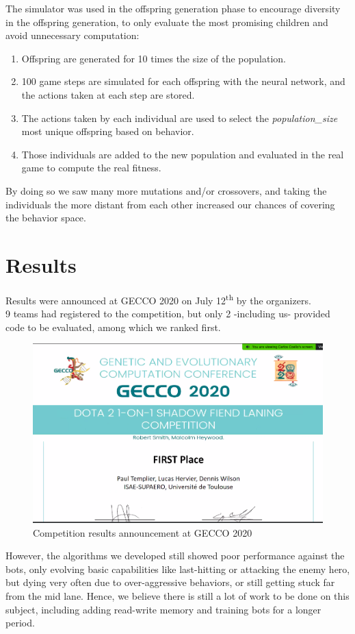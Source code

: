 The simulator was used in the offspring generation phase to encourage diversity in the offspring generation, to only evaluate the most promising children and avoid unnecessary computation:
\begin{enumerate}
    \item Offspring are generated for 10 times the size of the population.
    \item 100 game steps are simulated for each offspring with the neural network, and the actions taken at each step are stored.
    \item The actions taken by each individual are used to select the \textit{population\_size} most unique offspring based on behavior.
    \item Those individuals are added to the new population and evaluated in the real game to compute the real fitness.
\end{enumerate}

By doing so we saw many more mutations and/or crossovers, and taking the individuals the more distant from each other increased our chances of covering the behavior space.

\section{Results}

Results were announced at GECCO 2020 on July 12\textsuperscript{th} by the organizers. \\
9 teams had registered to the competition, but only 2 -including us- provided code to be evaluated, among which we ranked first. \\

\begin{figure}[H]
\centering
\includegraphics[width=12cm]{images/breezy-win.png}
\caption{Competition results announcement at GECCO 2020}
\end{figure}

However, the algorithms we developed still showed poor performance against the bots, only evolving basic capabilities like last-hitting or attacking the enemy hero, but dying very often due to over-aggressive behaviors, or still getting stuck far from the mid lane. Hence, we believe there is still a lot of work to be done on this subject, including adding read-write memory and training bots for a longer period.

